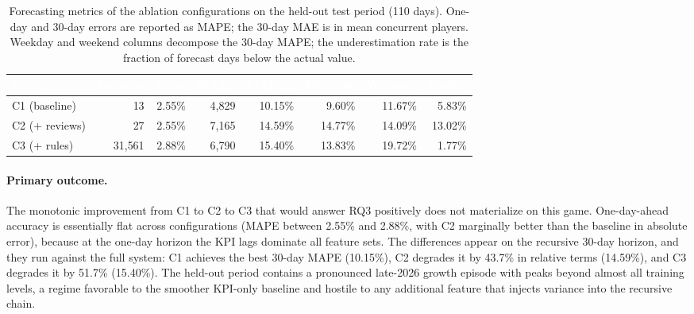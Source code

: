 \begin{table}[H]
    \centering
    \caption{Forecasting metrics of the ablation configurations on the held-out test period (110 days). One-day and 30-day errors are reported as MAPE; the 30-day MAE is in mean concurrent players. Weekday and weekend columns decompose the 30-day MAPE; the underestimation rate is the fraction of forecast days below the actual value.}
    \label{tab:rq3_metrics}
    \small
    \begin{tabular}{lrrrrrrr}
        \toprule
        \rowcolor{black}
        \textbf{\textcolor{white}{Config}} & \textbf{\textcolor{white}{Features}} & \textbf{\textcolor{white}{1-day}} & \textbf{\textcolor{white}{MAE$_{30}$}} & \textbf{\textcolor{white}{MAPE$_{30}$}} & \textbf{\textcolor{white}{Weekday}} & \textbf{\textcolor{white}{Weekend}} & \textbf{\textcolor{white}{Under.}}\\
        \midrule
        C1 (baseline) & 13 & 2.55\% & 4{,}829 & 10.15\% & 9.60\% & 11.67\% & 5.83\%\\
        C2 (+ reviews) & 27 & 2.55\% & 7{,}165 & 14.59\% & 14.77\% & 14.09\% & 13.02\%\\
        C3 (+ rules) & 31{,}561 & 2.88\% & 6{,}790 & 15.40\% & 13.83\% & 19.72\% & 1.77\%\\
        \bottomrule
    \end{tabular}
\end{table}

\paragraph{Primary outcome.} The monotonic improvement from C1 to C2 to C3 that would answer RQ3 positively does not materialize on this game. One-day-ahead accuracy is essentially flat across configurations (MAPE between 2.55\% and 2.88\%, with C2 marginally better than the baseline in absolute error), because at the one-day horizon the KPI lags dominate all feature sets. The differences appear on the recursive 30-day horizon, and they run against the full system: C1 achieves the best 30-day MAPE (10.15\%), C2 degrades it by 43.7\% in relative terms (14.59\%), and C3 degrades it by 51.7\% (15.40\%). The held-out period contains a pronounced late-2026 growth episode with peaks beyond almost all training levels, a regime favorable to the smoother KPI-only baseline and hostile to any additional feature that injects variance into the recursive chain.

